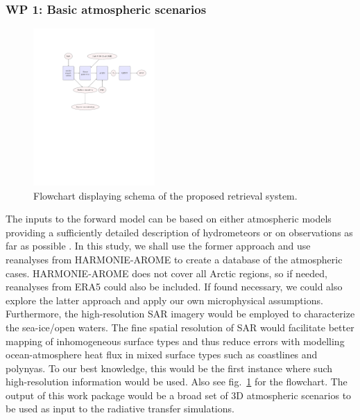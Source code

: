 \documentclass[12pt,oneside,a4paper]{article}
\begin{document}
\subsubsection*{WP 1: Basic atmospheric scenarios}
%
\begin{figure}[t]
	\centering
	\includegraphics[trim=140 370 40 125,clip,height = 60mm]{flowchart.pdf} 
	\caption{Flowchart displaying schema of the proposed retrieval system.}
	\label{fig:flowchart}
\end{figure}
\label{sec:emissivity}
The inputs to the forward model can be based on either atmospheric models providing a sufficiently detailed description of hydrometeors \citep[e.g.][]{wang2017statistical} or on observations as far as possible \citep{ekelund:using:20}. In this study, we shall use the former approach and use reanalyses from HARMONIE-AROME to create a database of the atmospheric cases. HARMONIE-AROME does not cover all Arctic regions, so if needed, reanalyses from ERA5 could also be included. If found necessary, we could also explore the latter approach and apply our own microphysical assumptions. Furthermore, the high-resolution SAR imagery would be employed to characterize the sea-ice/open waters. The fine spatial resolution of SAR would facilitate better mapping of inhomogeneous surface types and thus reduce errors with modelling ocean-atmosphere heat flux in mixed surface types such as coastlines and polynyas. To our best knowledge, this would be the first instance where such high-resolution information would be used. Also see fig.~\ref{fig:flowchart} for the flowchart. 
The output of this work package would be a broad set of 3D atmospheric scenarios to be used as input to the radiative transfer simulations.
\end{document}

